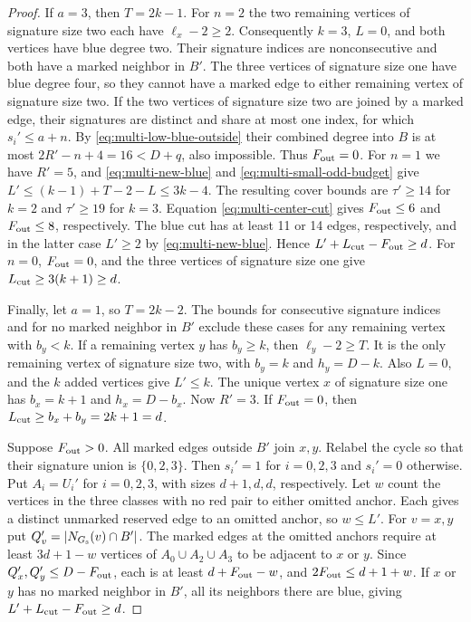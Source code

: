 \documentclass[preprint,11pt,numbers]{elsarticle-arxiv}
\numberwithin{equation}{section}
\theoremstyle{definition}
\begin{document}
\begin{proof}
If $a=3$, then $T=2k-1$. For $n=2$ the two remaining
vertices of signature size two each have $\ell_x-2\ge2$.
Consequently $k=3$, $L=0$, and both vertices have blue degree
two. Their signature indices are nonconsecutive and both have
a marked neighbor in $B'$. The three vertices of signature
size one have blue degree four, so they cannot have a marked
edge to either remaining vertex of signature size two. If the
two vertices of signature size two are joined by a marked edge,
their signatures are distinct and share at most one index,
for which $s_i'\le a+n$. By \eqref{eq:multi-low-blue-outside}
their combined degree into $B$ is at most $2R'-n+4=16<D+q$,
also impossible. Thus $F_{\rm out}=0$.
For $n=1$ we have $R'=5$, and
\eqref{eq:multi-new-blue} and \eqref{eq:multi-small-odd-budget}
give $L'\le(k-1)+T-2-L\le3k-4$. The resulting cover bounds
are $\tau'\ge14$ for $k=2$ and $\tau'\ge19$ for $k=3$.
Equation \eqref{eq:multi-center-cut} gives $F_{\rm out}\le6$ and $F_{\rm out}\le8$,
respectively. The blue cut has at least 11 or 14 edges,
respectively, and in the latter case $L'\ge2$ by
\eqref{eq:multi-new-blue}. Hence $L'+L_{\rm cut}-F_{\rm out}\ge d$.
For $n=0$, $F_{\rm out}=0$, and the three vertices of signature
size one give $L_{\rm cut}\ge3(k+1)\ge d$.

Finally, let $a=1$, so $T=2k-2$. The bounds for consecutive
signature indices and for no marked neighbor in $B'$ exclude
these cases for any remaining vertex with $b_y<k$. If a
remaining vertex $y$ has $b_y\ge k$, then $\ell_y-2\ge T$.
It is the only remaining vertex of signature size two, with
$b_y=k$ and $h_y=D-k$. Also $L=0$, and the $k$ added vertices
give $L'\le k$. The unique vertex $x$ of signature size one
has $b_x=k+1$ and $h_x=D-b_x$. Now $R'=3$. If $F_{\rm out}=0$,
then $L_{\rm cut}\ge b_x+b_y=2k+1=d$.

Suppose $F_{\rm out}>0$. All marked edges outside $B'$ join
$x,y$. Relabel the cycle so that their signature union is
$\{0,2,3\}$. Then $s_i'=1$ for $i=0,2,3$ and $s_i'=0$
otherwise. Put $A_i=U_i'$ for $i=0,2,3$, with sizes
$d+1,d,d$, respectively. Let $w$ count the vertices in the
three classes with no red pair to either omitted anchor.
Each gives a distinct unmarked reserved edge to an omitted
anchor, so $w\le L'$. For $v=x,y$ put
$Q_v'=|N_{G_{\rm s}}(v)\cap B'|$. The marked edges at the
omitted anchors require at least $3d+1-w$ vertices of
$A_0\cup A_2\cup A_3$ to be adjacent to $x$ or $y$.
Since $Q_x',Q_y'\le D-F_{\rm out}$, each is at least
$d+F_{\rm out}-w$, and $2F_{\rm out}\le d+1+w$. If $x$
or $y$ has no marked neighbor in $B'$, all its neighbors
there are blue, giving $L'+L_{\rm cut}-F_{\rm out}\ge d$.


\end{proof}
\end{document}
